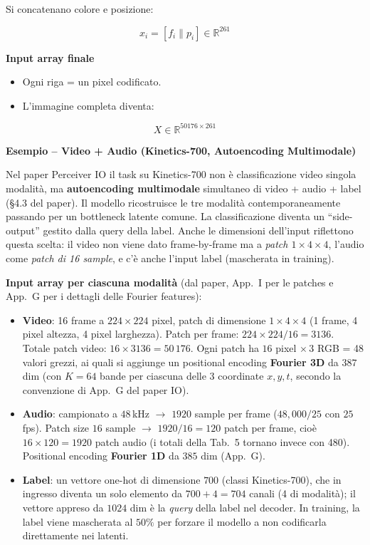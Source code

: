 \documentclass[
  11pt,
]{article}
\begin{document}
Si concatenano colore e posizione:

\[x_{i} = \left\lbrack f_{i}\| p_{i} \right\rbrack \in \mathbb{R}^{261}\]

\textbf{Input array finale}

\begin{itemize}
\item
  Ogni riga = un pixel codificato.
\item
  L'immagine completa diventa:
\end{itemize}

\[X \in \mathbb{R}^{50176 \times 261}\]

\textbf{Esempio -- Video + Audio (Kinetics-700, Autoencoding Multimodale)}

\begin{notabox}[title={\textbf{Attenzione: Kinetics nel Perceiver IO è autoencoding multimodale, non classificazione video pura}}]
Nel paper Perceiver IO il task su Kinetics-700 non è classificazione video singola modalità, ma \textbf{autoencoding multimodale} simultaneo di video + audio + label (\S4.3 del paper). Il modello ricostruisce le tre modalità contemporaneamente passando per un bottleneck latente comune. La classificazione diventa un ``side-output'' gestito dalla query della label. Anche le dimensioni dell'input riflettono questa scelta: il video non viene dato frame-by-frame ma a \emph{patch $1 \times 4 \times 4$}, l'audio come \emph{patch di 16 sample}, e c'è anche l'input label (mascherata in training).
\end{notabox}

\textbf{Input array per ciascuna modalità} (dal paper, App.\ I per le patches e App.\ G per i dettagli delle Fourier features):

\begin{itemize}\setlength\itemsep{0.3em}
\item \textbf{Video}: 16 frame a $224 \times 224$ pixel, patch di dimensione $1 \times 4 \times 4$ (1 frame, 4 pixel altezza, 4 pixel larghezza). Patch per frame: $224 \times 224 / 16 = 3136$. Totale patch video: $16 \times 3136 = 50\,176$. Ogni patch ha $16$ pixel $\times\, 3$ RGB = 48 valori grezzi, ai quali si aggiunge un positional encoding \textbf{Fourier 3D} da $387$ dim (con $K=64$ bande per ciascuna delle 3 coordinate $x, y, t$, secondo la convenzione di App.\ G del paper IO).
\item \textbf{Audio}: campionato a $48$\,kHz $\to$ $1920$ sample per frame ($48{,}000/25$ con $25$ fps). Patch size $16$ sample $\to$ $1920/16 = 120$ patch per frame, cioè $16 \times 120 = 1920$ patch audio (i totali della Tab.~5 tornano invece con 480). Positional encoding \textbf{Fourier 1D} da $385$ dim (App.\ G).
\item \textbf{Label}: un vettore one-hot di dimensione $700$ (classi Kinetics-700), che in ingresso diventa un solo elemento da $700 + 4 = 704$ canali (4 di modalità); il vettore appreso da $1024$ dim è la \emph{query} della label nel decoder. In training, la label viene mascherata al $50\%$ per forzare il modello a non codificarla direttamente nei latenti.
\end{itemize}
\end{document}
